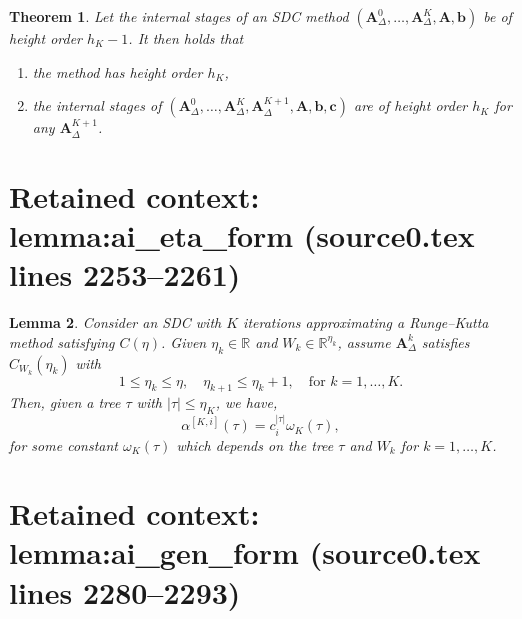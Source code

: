 \documentclass[10pt,a4paper]{amsart}
\newcommand{\reva}[1]{#1}%
\theoremstyle{plain}
\newtheorem{theorem}{Theorem}
\newtheorem{lemma}[theorem]{Lemma}
\theoremstyle{definition}
\theoremstyle{remark}
\begin{document}
\begin{theorem}\label{thm:order_per_sweep}
    Let the internal stages of an SDC method $(\bm{A}_{\Delta}^0, \ldots, \bm{A}_{\Delta}^K, \bm{A}, \bm{b})$ be of height order $h_K - 1$.
    It then holds that
    
    \begin{enumerate}
        \item the method has height order $h_K$,
        \item the internal stages of $(\bm{A}_{\Delta}^0, \ldots, \bm{A}_{\Delta}^K, \bm{A}_{\Delta}^{K+1}, \bm{A}, \bm{b}, \bm{c})$ are of height order $h_K$ for any $\bm{A}^{K+1}_\Delta$.
    \end{enumerate}
\end{theorem}


\section*{Retained context: lemma:ai\_eta\_form (source0.tex lines 2253--2261)}

\begin{lemma}\label{lemma:ai_eta_form}
    Consider an SDC with $K$ iterations \reva{approximating a Runge--Kutta method satisfying $C(\eta)$. Given $\eta_k \in \mathbb{R}$ and $W_k \in \mathbb{R}^{\eta_k}$, assume} $\bm{A}_\Delta^k$ satisfies $C_{W_k}(\eta_k)$ with
    \[ 1 \leq \eta_k \leq \eta, \quad \eta_{k+1} \leq \eta_k + 1, \quad \text{for } k = 1, \dots, K.\]
    Then, given a tree $\tau$ with $|\tau| \leq \eta_K$, we have,
    \begin{equation}\label{eq:ai_eta_form}
        \alpha^{[K,i]} (\tau) = c_i^{|\tau|} \omega_K (\tau),
    \end{equation}
    \reva{for some constant $\omega_K (\tau)$ which depends on the tree $\tau$ and $W_k$ for $k=1,\dots,K$.}
\end{lemma}


\section*{Retained context: lemma:ai\_gen\_form (source0.tex lines 2280--2293)}
\end{document}
